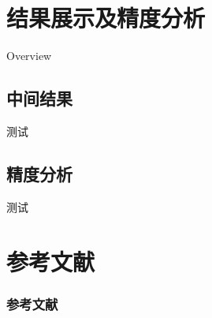 \documentclass[10pt,xcolor=dvipsnames,fontset=none,punct=CCT]{ctexbeamer}
\begin{document}
\section{结果展示及精度分析}
\begin{frame}{Overview}
\end{frame}

\subsection{中间结果}
\begin{frame}
  测试
\end{frame}

\subsection{精度分析}
\begin{frame}
  测试
\end{frame}

\section*{参考文献}
\begin{frame}
  \frametitle{参考文献}
  \printbibliography
\end{frame}
\end{document}

